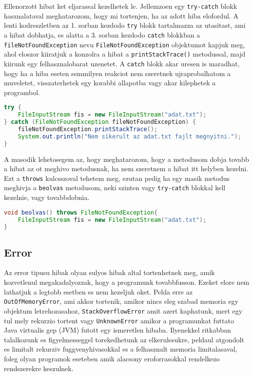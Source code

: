 \documentclass{article}
\let\l\lstinline
\begin{document}
Ellenorzott hibat ket eljarassal kezelhetek le. Jellemzoen egy \l{try-catch} blokk hasznalataval meghatarozom, hogy mi tortenjen, ha az adott hiba elofordul. A lenti kodreszletben az 1. sorban kezdodo \l{try} blokk tartalmazza az utasitast, ami a hibat dobhatja, es alatta a 3. sorban kezdodo \l{catch} blokkban a \l{fileNotFoundException} nevu \l{FileNotFoundException} objektumot kapjuk meg, ahol eloszor kiiratjuk a konzolra a hibat a \l{printStackTrace()} metodussal, majd kiirunk egy felhasznalobarat uzenetet. A \l{catch} blokk akar uresen is maradhat, hogy ha a hiba eseten semmilyen reakciot nem szeretnek ujraprobalhatom a muveletet, visszaterhetek egy korabbi allapotba vagy akar kilephetek a programbol.

\begin{lstlisting}[language=Java, caption=Kezelt FileNotFoundException]
try {
    FileInputStream fis = new FileInputStream("adat.txt");
} catch (FileNotFoundException fileNotFoundException) {
    fileNotFoundException.printStackTrace();
    System.out.println("Nem sikerult az adat.txt fajlt megnyitni.");
}
\end{lstlisting}

A masodik lehetosegem az, hogy meghatarozom, hogy a metodusom dobja tovabb a hibat az ot meghivo metodusnak, ha nem szeretnem a hibat itt helyben kezelni. Ezt a \l{throws} kulcsszoval tehetem meg, ezutan pedig ha egy masik metodus meghivja a \l{beolvas} metodusom, neki szinten vagy \l{try-catch} blokkal kell kezelnie, vagy tovabbdobnia.

\begin{lstlisting}[language=Java, caption=Tovabbdobott FileNotFoundException]
void beolvas() throws FileNotFoundException{
    FileInputStream fis = new FileInputStream("adat.txt");
}
\end{lstlisting}


\subsection{Error}

Az error tipusu hibak olyan sulyos hibak altal tortenhetnek meg, amik kozvetlenul megakadalyozzak, hogy a programunk tovabbfusson. Ezeket elore nem lathatjuk a legtobb esetben es nem kezeljuk oket. Pelda erre az \l{OutOfMemoryError}, ami akkor tortenik, amikor nincs eleg szabad memoria egy objektum letrehozasahoz, \l{StackOverflowError} amit azert kaphatunk, mert egy tul mely rekurzio tortent vagy \l{UnknownError} amikor a programunkat futtato Java virtualis gep (JVM) futott egy ismeretlen hibaba. Ilyenekkel ritkabban talalkozunk es figyelmesseggel torekedhetunk az elkerulesukre, peldaul atgondolt es limitalt rekurziv fuggvenyhivasokkal es a felhasznalt memoria limitalasaval, foleg olyan programok eseteben amik alacsony eroforrasokkal rendelkezo rendszerekre keszulnek.
\end{document}
